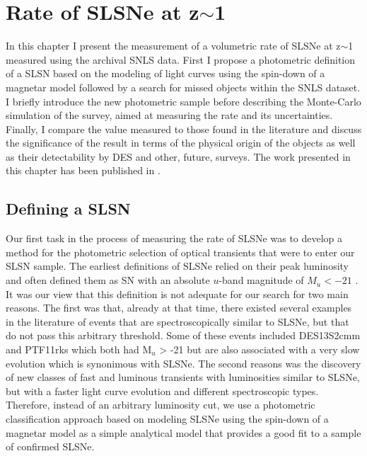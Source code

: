 \chapter{Rate of SLSNe at z$\sim$1}
\label{Chapter3}

In this chapter I present the measurement of a volumetric rate of SLSNe at z$\sim$1 measured using the archival SNLS data. First I propose a photometric definition of a SLSN based on the modeling of light curves using the spin-down of a magnetar model followed by a search for missed objects within the SNLS dataset. I briefly introduce the new photometric sample before describing the Monte-Carlo simulation of the survey, aimed at measuring the rate and its uncertainties. Finally, I compare the value measured to those found in the literature and discuss the significance of the result in terms of the physical origin of the objects as well as their detectability by DES and other, future, surveys. The work presented in this chapter has been published in \citet{Prajs2016}.

\section{Defining a SLSN}
Our first task in the process of measuring the rate of SLSNe was to develop a method for the photometric selection of optical transients that were to enter our SLSN sample. The earliest definitions of SLSNe relied on their peak luminosity and often defined them as SN with an absolute $u$-band magnitude of $M_{u}<-21$ \citep{2012Sci...337..927G}. It was our view that this definition is not adequate for our search for two main reasons. The first was that, already at that time, there existed several examples in the literature of events that are spectroscopically similar to SLSNe, but that do not pass this arbitrary threshold. Some of these events included DES13S2cmm \citep{2015MNRAS.449.1215P} and PTF11rks \citep{2013ApJ...770..128I} which both had M$_u$ > -21 but are also associated with a very slow evolution which is synonimous with SLSNe. The second reasons was the discovery of new classes of fast and luminous transients \citep{2016ApJ...819...35A} with luminosities similar to SLSNe, but with a faster light curve evolution and different spectroscopic types. Therefore, instead of an arbitrary luminosity cut, we use a photometric classification approach based on modeling SLSNe using the spin-down of a magnetar model as a simple analytical model that provides a good fit to a sample of confirmed SLSNe.

